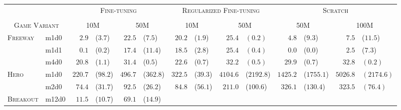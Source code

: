 
\begin{tabular}{ll rl rl rl rl rl rl}
\multicolumn{2}{c}{} & \multicolumn{4}{c}{\textsc{Fine-tuning}} & \multicolumn{4}{c}{\textsc{Regularized Fine-tuning}} & \multicolumn{4}{c}{\textsc{Scratch}} \\
\cmidrule(lr){3-6}\cmidrule(lr){7-10} \cmidrule(lr){11-14} \\
\multicolumn{2}{c}{\textsc{Game Variant}}
& \multicolumn{2}{c}{10M} & \multicolumn{2}{c}{50M}
& \multicolumn{2}{c}{10M} & \multicolumn{2}{c}{50M}
& \multicolumn{2}{c}{\textsc{50M}} &  \multicolumn{2}{c}{\textsc{100M}} \\ \midrule[0.4mm]

\multirow{3}{*}{\textsc{Freeway}}
& m1d0
& $2.9$ & ($3.7$) %
& $22.5$ & ($7.5$) %

& $20.2$ & ($1.9$) %
& $25.4$ & $(0.2)$ %

& $4.8$ & ($9.3$)
& $7.5$ & ($11.5$) \\  \cmidrule(l){2-14}

& m1d1
& $0.1$ & ($0.2$) %
& $17.4$ & ($11.4$) %

& $18.5$ & ($2.8$) %
& $25.4$ & $(0.4)$ %

& $0.0$ & ($0.0$)
& $2.5$ & ($7.3$) \\  \cmidrule(l){2-14}

& m4d0
& $20.8$ & ($1.1$) %
& $31.4$ & ($0.5$) %

& $22.6$ & ($0.7$) %
& $32.2$ & $(0.5)$ %

& $29.9$ & ($0.7$)
& $32.8$ & $(0.2)$ \\ \cmidrule[0.2mm]{1-14}

\multirow{2}{*}{\textsc{Hero}}
& m1d0
& $220.7$ & ($98.2$) %
& $496.7$ & ($362.8$) %

& $322.5$ & ($39.3$) %
& $4104.6$ & ($2192.8$) %

& $1425.2$ & ($1755.1$)
& $5026.8$ & $(2174.6)$ \\ \cmidrule(l){2-14}

& m2d0
& $74.4$ & ($31.7$) %
& $92.5$ & ($26.2$) %

& $84.8$ & ($56.1$) %
& $211.0$ & ($100.6$) %

& $326.1$ & ($130.4$)
& $323.5$ & $(76.4)$ \\ \cmidrule[0.2mm]{1-14}

\multirow{1}{*}{\textsc{Breakout}}
& m12d0
& $11.5$ & ($10.7$) %
& $69.1$ & ($14.9$) %


\end{tabular}
